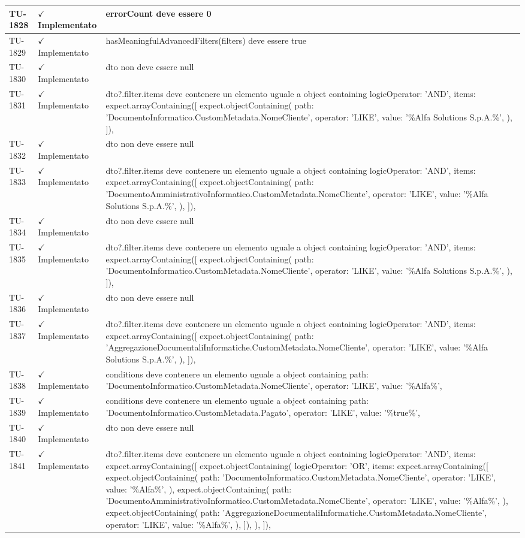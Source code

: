 ﻿\documentclass[a4paper,12pt]{article}
\newcommand{\ok}{\textcolor{green!60!black}{$\checkmark$ Implementato}}
\begin{document}
\begin{longtable}{|p{2cm}|p{3.5cm}|p{9.5cm}|}
\hline
TU-1828 & \ok & errorCount deve essere 0 \\
\hline
TU-1829 & \ok & hasMeaningfulAdvancedFilters(filters) deve essere true \\
\hline
TU-1830 & \ok & dto non deve essere null \\
\hline
TU-1831 & \ok & dto?.filter.items deve contenere un elemento uguale a object containing { logicOperator: 'AND', items: expect.arrayContaining([ expect.objectContaining({ path: 'DocumentoInformatico.CustomMetadata.NomeCliente', operator: 'LIKE', value: '\%Alfa Solutions S.p.A.\%', }), ]), } \\
\hline
TU-1832 & \ok & dto non deve essere null \\
\hline
TU-1833 & \ok & dto?.filter.items deve contenere un elemento uguale a object containing { logicOperator: 'AND', items: expect.arrayContaining([ expect.objectContaining({ path: 'DocumentoAmministrativoInformatico.CustomMetadata.NomeCliente', operator: 'LIKE', value: '\%Alfa Solutions S.p.A.\%', }), ]), } \\
\hline
TU-1834 & \ok & dto non deve essere null \\
\hline
TU-1835 & \ok & dto?.filter.items deve contenere un elemento uguale a object containing { logicOperator: 'AND', items: expect.arrayContaining([ expect.objectContaining({ path: 'DocumentoInformatico.CustomMetadata.NomeCliente', operator: 'LIKE', value: '\%Alfa Solutions S.p.A.\%', }), ]), } \\
\hline
TU-1836 & \ok & dto non deve essere null \\
\hline
TU-1837 & \ok & dto?.filter.items deve contenere un elemento uguale a object containing { logicOperator: 'AND', items: expect.arrayContaining([ expect.objectContaining({ path: 'AggregazioneDocumentaliInformatiche.CustomMetadata.NomeCliente', operator: 'LIKE', value: '\%Alfa Solutions S.p.A.\%', }), ]), } \\
\hline
TU-1838 & \ok & conditions deve contenere un elemento uguale a object containing { path: 'DocumentoInformatico.CustomMetadata.NomeCliente', operator: 'LIKE', value: '\%Alfa\%', } \\
\hline
TU-1839 & \ok & conditions deve contenere un elemento uguale a object containing { path: 'DocumentoInformatico.CustomMetadata.Pagato', operator: 'LIKE', value: '\%true\%', } \\
\hline
TU-1840 & \ok & dto non deve essere null \\
\hline
TU-1841 & \ok & dto?.filter.items deve contenere un elemento uguale a object containing { logicOperator: 'AND', items: expect.arrayContaining([ expect.objectContaining({ logicOperator: 'OR', items: expect.arrayContaining([ expect.objectContaining({ path: 'DocumentoInformatico.CustomMetadata.NomeCliente', operator: 'LIKE', value: '\%Alfa\%', }), expect.objectContaining({ path: 'DocumentoAmministrativoInformatico.CustomMetadata.NomeCliente', operator: 'LIKE', value: '\%Alfa\%', }), expect.objectContaining({ path: 'AggregazioneDocumentaliInformatiche.CustomMetadata.NomeCliente', operator: 'LIKE', value: '\%Alfa\%', }), ]), }), ]), } \\

\end{longtable}
\end{document}
